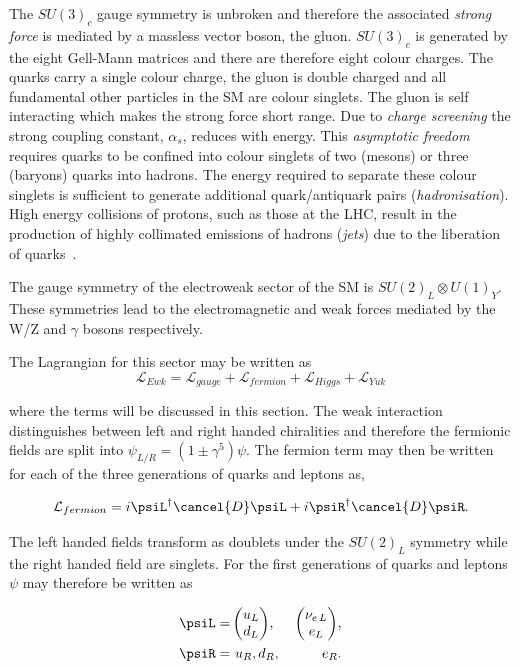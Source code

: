 The $SU(3)_c$ gauge symmetry is unbroken and therefore the associated
\emph{strong force} is mediated by a massless vector boson, the gluon.
$SU(3)_c$ is generated by the eight Gell-Mann matrices and there are therefore eight colour charges. 
The quarks carry a single colour charge, the gluon is double charged and all fundamental 
other particles in the SM are colour singlets. The gluon is self interacting which makes
the strong force short range. Due to \emph{charge screening} the strong coupling constant, $\alpha_s$, 
reduces with energy. This \emph{asymptotic freedom} requires quarks to be confined into colour singlets
of two (mesons) or three (baryons) quarks into hadrons. The energy required to separate these colour singlets 
is sufficient to generate additional quark/antiquark pairs (\emph{hadronisation}). High
energy collisions of protons, such as those at the LHC, result in the production of highly 
collimated emissions of hadrons (\emph{jets}) due to the liberation of quarks~\cite{salam}.

The gauge symmetry of the electroweak sector of the SM is $SU(2)_L\otimes U(1)_Y$. These symmetries lead
to the electromagnetic and weak forces mediated by the W/Z and $\gamma$ bosons respectively.

The Lagrangian for this sector may be written as 
\begin{equation}
\mathcal{L}_{Ewk} = \mathcal{L}_{gauge} + \mathcal{L}_{fermion} + \mathcal{L}_{Higgs} + \mathcal{L}_{Yuk}
\end{equation}

where the terms will be discussed in this section. The weak interaction distinguishes
between left and right handed chiralities and therefore the fermionic fields are split into
$\psi_{L/R} = (1\pm\gamma^5)\psi$. The fermion term may then be written for each of the 
three generations of quarks and leptons as,

\begin{equation}
\mathcal{L}_{fermion} = i \psiL^{\dagger}\cancel{D}\psiL + i \psiR^{\dagger}\cancel{D}\psiR.
\end{equation}

The left handed fields transform as doublets under the $SU(2)_L$ symmetry
while the right handed field are singlets.
For the first generations of quarks and leptons $\psi$ may therefore be written as

\begin{align}
\qquad\qquad\qquad\psiL =\,&{\begin{pmatrix} u_L \\ d_L \end{pmatrix}},\, &{\begin{pmatrix} \nu_{e\,L} \\ e_L \end{pmatrix}},\nonumber\qquad\qquad\qquad\\
\qquad\qquad\qquad\psiR = \,&\,u_R,d_R,\, &\,e_R.\qquad\qquad\qquad
\end{align}

